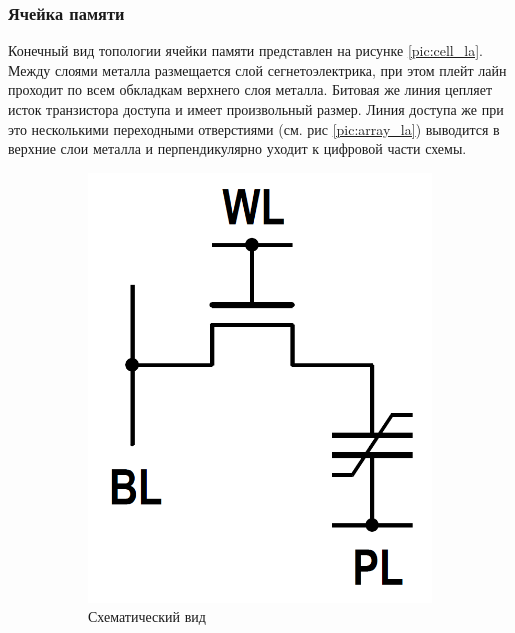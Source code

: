 \documentclass[a4paper,12pt]{article} %
\begin{document}
\subsubsection{Ячейка памяти}

Конечный вид топологии ячейки памяти представлен на рисунке \ref{pic:cell_la}. Между слоями металла размещается слой сегнетоэлектрика, при этом плейт лайн проходит по всем обкладкам верхнего слоя металла. Битовая же линия цепляет исток транзистора доступа и имеет произвольный размер. Линия доступа же при это несколькими переходными отверстиями (см. рис \ref{pic:array_la}) выводится в верхние слои металла и перпендикулярно уходит к цифровой части схемы.

\begin{figure}[H]
  \begin{subfigure}[b]{0.2\textwidth}
    \includegraphics[width=\textwidth]{FRAM-fig1.png}
    \caption{Схематический вид}
    \label{pic:cell_sc}
  \end{subfigure}
  \begin{subfigure}[b]{0.8\textwidth}

\end{subfigure}
\end{figure}
\end{document}
